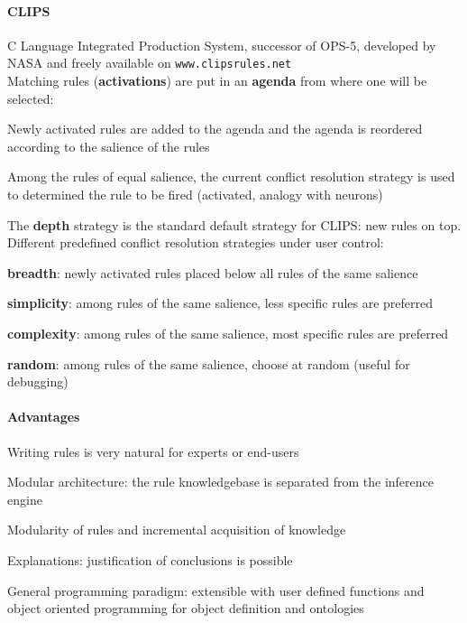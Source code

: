 \documentclass[10pt]{report}
\begin{document}
\paragraph{CLIPS} C Language Integrated Production System, successor of OPS-5, developed by NASA and freely available on \texttt{www.clipsrules.net}\\
Matching rules (\textbf{activations}) are put in an \textbf{agenda} from where one will be selected:
\begin{list}{}{}
	\item Newly activated rules are added to the agenda and the agenda is reordered according to the salience of the rules
	\item Among the rules of equal salience, the current conflict resolution strategy is used to determined the rule to be fired (activated, analogy with neurons)
\end{list}
The \textbf{depth} strategy is the standard default strategy for CLIPS: new rules on top. Different predefined conflict resolution strategies under user control:
\begin{list}{}{}
	\item \textbf{breadth}: newly activated rules placed below all rules of the same salience
	\item \textbf{simplicity}: among rules of the same salience, less specific rules are preferred
	\item \textbf{complexity}: among rules of the same salience, most specific rules are preferred
	\item \textbf{random}: among rules of the same salience, choose at random (useful for debugging)
\end{list}
\paragraph{Advantages} \begin{list}{}{}
	\item Writing rules is very natural for experts or end-users
	\item Modular architecture: the rule knowledgebase is separated from the inference engine
	\item Modularity of rules and incremental acquisition of knowledge
	\item Explanations: justification of conclusions is possible
	\item General programming paradigm: extensible with user defined functions and object oriented programming for object definition and ontologies
\end{list}
\end{document}
